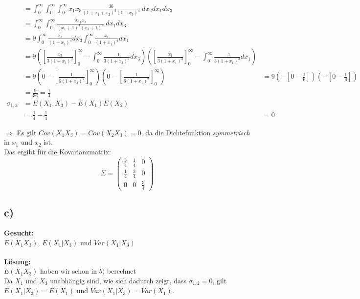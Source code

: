 \documentclass{article}
\begin{document}
\begin{align*}
    &= \int_{0}^{\infty} \int_{0}^{\infty} \int_{0}^{\infty} x_1 x_3 \frac{36}{(1+x_1+x_2)^5(1+x_3)^4} ~ dx_2 dx_1 dx_3 \\
    &= \int_{0}^{\infty} \int_{0}^{\infty} \frac{9x_1x_3}{(x_1 + 1)^4(x_3 + 1)^4} ~ dx_1 dx_3 \\
    &= 9 \int_{0}^{\infty}\frac{x_3}{(1+x_3)^4} dx_3 \int_{0}^{\infty}\frac{x_1}{(1+x_1)^4} dx_1  \\
    &= 9 \left(\left[\frac{x_3}{3(1+x_3)^3}\right]_0^{\infty} - \int_0^{\infty}\frac{-1}{3(1+x_3)^3} dx_3\right) \left(\left[\frac{x_1}{3(1+x_1)^3}\right]_0^{\infty} - \int_0^{\infty}\frac{-1}{3(1+x_1)^3} dx_1\right) \\
    &= 9 \left(0 - \left[\frac{1}{6(1 + x_3)^2}\right]_0^{\infty}\right)\left(0 - \left[\frac{1}{6(1 + x_1)^2}\right]_0^{\infty}\right)
    &= 9 \left(-\left[0 - \frac{1}{6}\right]\right)\left(-\left[0 - \frac{1}{6}\right]\right) \\
    &= \frac{9}{36} = \frac{1}{4}\\
    \sigma_{1,3} &= E(X_1, X_3) - E(X_1)E(X_2) \\
    &= \frac{1}{4} - \frac{1}{4} 
    &= 0
    \end{align*}

    $\Longrightarrow $ Es gilt $Cov(X_1X_3) = Cov(X_2X_3) = 0$, da die Dichtefunktion \textit{symmetrisch} in $x_1$ und $x_2$ ist. \\


    Das ergibt für die Kovarianzmatrix: 
    \[\Sigma = \begin{pmatrix}
        \frac{3}{4} & \frac{1}{4} & 0 \\
        \frac{1}{4} & \frac{3}{4} & 0 \\
        0 & 0 & \frac{3}{4}
    \end{pmatrix}\]

    \subsection*{c)}
    \textbf{Gesucht:} \\

    $E(X_1X_3)$, $E(X_1|X_3)$ und $Var(X_1|X_3)$ \\ \\
    \textbf{Lösung: }\\ 

    $E(X_1X_3)$ haben wir schon in $b)$ berechnet \\

    Da $X_1$ und $X_3$ unabhängig sind, wie sich dadurch zeigt, dass $\sigma_{1, 2} = 0$, gilt $E(X_1|X_3) = E(X_1)$ und $Var(X_1|X_3) = Var(X_1)$.
\end{document}
